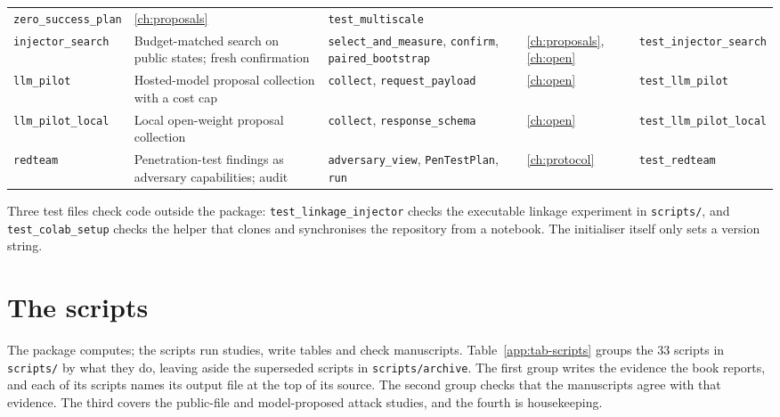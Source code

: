 \begin{table}[ht]
\begin{tabular}{@{}>{\raggedright\arraybackslash}p{2.2cm}>{\raggedright\arraybackslash}p{3.5cm}>{\raggedright\arraybackslash}p{3.9cm}>{\raggedright\arraybackslash}p{1.6cm}>{\raggedright\arraybackslash}p{2.9cm}@{}}
\texttt{zero\_\allowbreak{}success\_\allowbreak{}plan} & \ref{ch:proposals} & \texttt{test\_\allowbreak{}multiscale} \\
\texttt{injector\_\allowbreak{}search} & Budget-matched search on public states;
fresh confirmation & \texttt{select\_\allowbreak{}and\_\allowbreak{}measure}, \texttt{confirm},
\texttt{paired\_\allowbreak{}bootstrap} & \ref{ch:proposals}, \ref{ch:open} &
\texttt{test\_\allowbreak{}injector\_\allowbreak{}search} \\
\texttt{llm\_\allowbreak{}pilot} & Hosted-model proposal collection with a cost cap &
\texttt{collect}, \texttt{request\_\allowbreak{}payload} & \ref{ch:open} &
\texttt{test\_\allowbreak{}llm\_\allowbreak{}pilot} \\
\texttt{llm\_\allowbreak{}pilot\_\allowbreak{}local} & Local open-weight proposal collection &
\texttt{collect}, \texttt{response\_\allowbreak{}schema} & \ref{ch:open} &
\texttt{test\_\allowbreak{}llm\_\allowbreak{}pilot\_\allowbreak{}local} \\
\texttt{redteam} & Penetration-test findings as adversary capabilities; audit &
\texttt{adversary\_\allowbreak{}view}, \texttt{PenTestPlan}, \texttt{run} & \ref{ch:protocol} &
\texttt{test\_\allowbreak{}redteam} \\
\bottomrule
\end{tabular}
\end{table}

Three test files check code outside the package: \texttt{test\_\allowbreak{}linkage\_\allowbreak{}injector}
checks the executable linkage experiment in \texttt{scripts/\allowbreak{}}, and
\texttt{test\_\allowbreak{}colab\_\allowbreak{}setup} checks the helper that clones and synchronises the
repository from a notebook. The initialiser itself only sets a version string.

\section{The scripts}

The package computes; the scripts run studies, write tables and check manuscripts.
Table~\ref{app:tab-scripts} groups the 33 scripts in \texttt{scripts/\allowbreak{}} by what they do,
leaving aside the superseded scripts in \texttt{scripts/\allowbreak{}archive}.
The first group writes the evidence the book reports, and each of its scripts names
its output file at the top of its source. The second group checks that the manuscripts
agree with that evidence. The third covers the public-file and model-proposed attack
studies, and the fourth is housekeeping.

